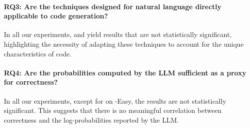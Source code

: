 \paragraph{RQ3: Are the techniques designed for natural language directly applicable to code generation?}
In all our experiments, \SEOriginal and \MIOriginal yield results that are not statistically significant, highlighting the necessity of adapting these techniques to account for the unique characteristics of code.




\paragraph{RQ4: Are the probabilities computed by the LLM sufficient as a proxy for correctness?}
In all our experiments, except for \gptturbo on \livecodebench-Easy, the results are not statistically significant. This suggests that there is no meaningful correlation between correctness and the log-probabilities reported by the LLM.



